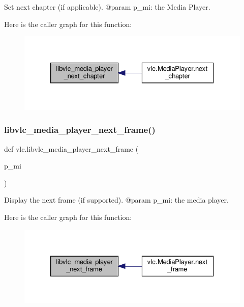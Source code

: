 \begin{DoxyVerb}Set next chapter (if applicable).
@param p_mi: the Media Player.
\end{DoxyVerb}
 Here is the caller graph for this function\+:
\nopagebreak
\begin{figure}[H]
\begin{center}
\leavevmode
\includegraphics[width=326pt]{namespacevlc_a3aeeb47d986476bf88849c78532bf066_icgraph}
\end{center}
\end{figure}
\mbox{\label{namespacevlc_a421aba27bf34a6bc342d3d0a019efb64}} 
\subsubsection{\texorpdfstring{libvlc\+\_\+media\+\_\+player\+\_\+next\+\_\+frame()}{libvlc\_media\_player\_next\_frame()}}
{\footnotesize\ttfamily def vlc.\+libvlc\+\_\+media\+\_\+player\+\_\+next\+\_\+frame (\begin{DoxyParamCaption}\item[{}]{p\+\_\+mi }\end{DoxyParamCaption})}

\begin{DoxyVerb}Display the next frame (if supported).
@param p_mi: the media player.
\end{DoxyVerb}
 Here is the caller graph for this function\+:
\nopagebreak
\begin{figure}[H]
\begin{center}
\leavevmode
\includegraphics[width=326pt]{namespacevlc_a421aba27bf34a6bc342d3d0a019efb64_icgraph}
\end{center}
\end{figure}
\mbox{\label{namespacevlc_a14e54bf8f28013d3b04df6b07a717fba}} 
